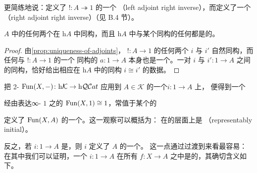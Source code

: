 更简练地说：\trInitial{}\trElement{}定义了\trFunctor{} $!\colon A\twoheadrightarrow 1$ 的一个%
\emph{\trLeftAdjoint{}\trRightInverse}（left adjoint right inverse），而\trTerminal{}\trElement{}定义了一个%
\emph{\trRightAdjoint{}\trRightInverse}（right adjoint right inverse）（见 B.4 节）。

\begin{lemma}[唯一性]\label{lem:uniqueness-of-initial-elements}
\trInfinityCategory{} $A$ 中的任何两个\trInitial{}\trElement{}在 $\mathrm{h}A$ 中同构，而且
$\mathrm{h}A$ 中与某个\trInitial{}\trElement{}同构的任何\trElement{}都是\trInitial{}的。
\end{lemma}
\begin{proof}
由\cref{prop:uniqueness-of-adjoints}，\trFunctor{} $!\colon A\to 1$ 的任何两个%
\trLeftAdjoint{} $i$ 与 $i'$ 自然同构，而任何与 $!\colon A\to 1$ 的一个%
\trLeftAdjoint{}同构的 $a\colon 1\to A$ 本身也是一个\trLeftAdjoint{}。一对\trFunctor{}
$i$ 与 $i'\colon 1\to A$ 之间的\trNaturalTransformation{}同构，恰好给出相应\trElement{}在%
\trHomotopyCategory{} $\mathrm{h}A$ 中的同构 $i\cong i'$ 的数据。
\end{proof}

\begin{remark}\label{rem:representably-initial}
把 2-\trFunctor{} $\operatorname{Fun}(X,-)\colon\mathrm{h}\mathcal{K}\to\mathrm{h}\mathcal{Q}\mathcal{C}at$ 应用到%
\trInfinityCategory{} $A\in\mathcal{K}$ 的一个\trInitial{}\trElement $i\colon 1\to A$ 上，
便得到一个\trAdjunction
\begin{center}
\end{center}
经由表达\trTerminal{}∞-\trCategory{} $1$ 之\trUniversalProperty{}的\trIsomorphism{}
$\operatorname{Fun}(X,1)\cong 1$，常值于某个\trInitial{}\trElement{}的\trFunctor
\begin{center}
\end{center}
定义了\trFunctorSpace{} $\operatorname{Fun}(X,A)$ 的一个\trInitial{}\trElement{}。这一观察可以概括为：
\trInitial{}\trElement{}在\trInfinityCosmos{}的层面上是\emph{\trRepresentablyInitial}
（representably initial）。

反之，若 $i\colon 1\to A$ 是\trRepresentablyInitial{}，则 $i$ 定义了 $A$ 的一个\trInitial{}\trElement{}。
这一点通过过渡到\trHomotopyTwoCategory{}来看最容易：在其中我们可以证明，一个%
\trInitial{}\trElement $i\colon 1\to A$ 在所有\emph{\trGeneralizedElement}
$f\colon X\to A$ 之中是\trInitial{}的，其确切含义如下。
\end{remark}

